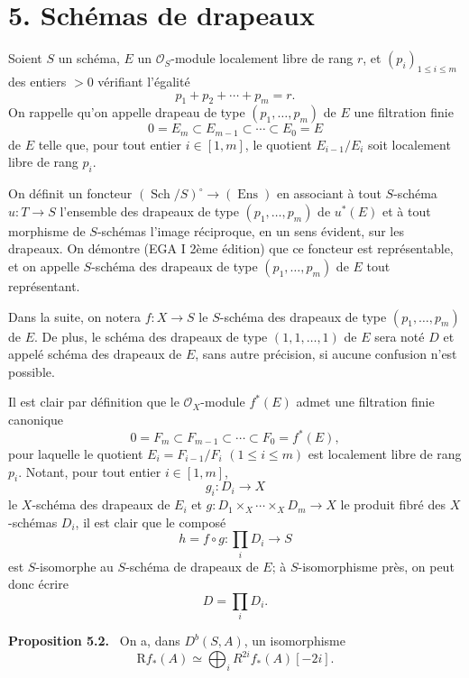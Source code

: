 \documentclass[11pt]{article}
\newenvironment{statement}[1]{\par\medskip\noindent\textbf{#1.}\ }{\par\medskip}
\begin{document}
\section*{5. Schémas de drapeaux}

Soient $S$ un schéma, $E$ un $\mathcal O_S$-module localement libre de rang $r$, et $(p_i)_{1\le i\le m}$ des entiers $>0$ vérifiant l'égalité
\[
p_1+p_2+\cdots+p_m=r.
\]
On rappelle qu'on appelle drapeau de type $(p_1,\ldots,p_m)$ de $E$ une filtration finie
\[
0=E_m\subset E_{m-1}\subset\cdots\subset E_0=E
\]
de $E$ telle que, pour tout entier $i\in[1,m]$, le quotient $E_{i-1}/E_i$ soit localement libre de rang $p_i$.

On définit un foncteur $(\operatorname{Sch}/S)^\circ\to(\operatorname{Ens})$ en associant à tout $S$-schéma $u:T\to S$ l'ensemble des drapeaux de type $(p_1,\ldots,p_m)$ de $u^*(E)$ et à tout morphisme de $S$-schémas l'image réciproque, en un sens évident, sur les drapeaux. On démontre (EGA I 2ème édition) que ce foncteur est représentable, et on appelle $S$-schéma des drapeaux de type $(p_1,\ldots,p_m)$ de $E$ tout représentant.

Dans la suite, on notera $f:X\to S$ le $S$-schéma des drapeaux de type $(p_1,\ldots,p_m)$ de $E$. De plus, le schéma des drapeaux de type $(1,1,\ldots,1)$ de $E$ sera noté $D$ et appelé schéma des drapeaux de $E$, sans autre précision, si aucune confusion n'est possible.

Il est clair par définition que le $\mathcal O_X$-module $f^*(E)$ admet une filtration finie canonique
\[
0=F_m\subset F_{m-1}\subset\cdots\subset F_0=f^*(E),
\]
pour laquelle le quotient $E_i=F_{i-1}/F_i$ $(1\le i\le m)$ est localement libre de rang $p_i$. Notant, pour tout entier $i\in[1,m]$,
\[
g_i:D_i\to X
\]
le $X$-schéma des drapeaux de $E_i$ et $g:D_1\times_X\cdots\times_X D_m\to X$ le produit fibré des $X$-schémas $D_i$, il est clair que le composé
\[
h=f\circ g:\prod_iD_i\to S
\tag{5.1}
\]
est $S$-isomorphe au $S$-schéma de drapeaux de $E$; à $S$-isomorphisme près, on peut donc écrire
\[
D=\prod_iD_i.
\]

\begin{statement}{Proposition 5.2}
On a, dans $D^b(S,A)$, un isomorphisme
\[
\mathrm Rf_*(A)\simeq\bigoplus_i R^{2i}f_*(A)[-2i].
\]
\end{statement}
\end{document}
